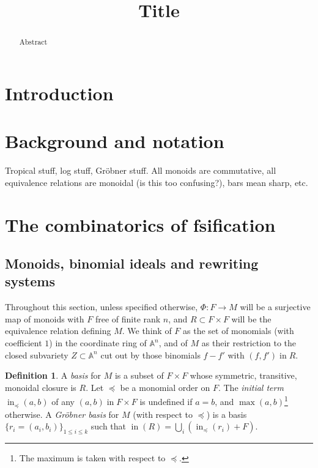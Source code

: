 \documentclass[a4paper,12pt]{amsart} %
\title[label]{Title}
\numberwithin{equation}{subsection}
\renewcommand{\in}{\operatorname{in}}
\newcommand{\inleq}{\operatorname{in}_{\preceq}}
\newcommand{\bb}[1]{{\mathbb{#1}}}
\theoremstyle{definition}
\newtheorem{definition}{Definition}[section]
\theoremstyle{plain}%
\theoremstyle{remark}
\begin{document}
\begin{abstract} 
Abstract
\end{abstract}

\maketitle
	


\tableofcontents



\section{Introduction}

\section{Background and notation}
Tropical stuff, log stuff, Gr\"obner stuff. All monoids are commutative, all equivalence relations are monoidal (is this too confusing?), bars mean sharp, etc.

\section{The combinatorics of fsification}
\subsection{Monoids, binomial ideals and rewriting systems}

Throughout this section, unless specified otherwise, $\Phi\colon F \to M$ will be a surjective map of monoids with $F$ free of finite rank $n$, and $R\subset F\times F$ will be the equivalence relation defining $M$. We think of $F$ as the set of monomials (with coefficient $1$) in the coordinate ring of $\bb A^n$, and of $M$ as their restriction to the closed subvariety $Z\subset \bb A^n$ cut out by those binomials $f-f'$ with $(f,f')\in R$.

\begin{definition}
	A \emph{basis} for $M$ is a subset of $F\times F$ whose symmetric, transitive, monoidal closure is $R$. Let $\preceq$ be a monomial order on $F$. The \emph{initial term} $\inleq(a,b)$ of any $(a,b)\in F\times F$ is undefined if $a=b$, and $\max(a,b)$\footnote{The maximum is taken with respect to $\preceq$.} otherwise. A \emph{Gr\"obner basis} for $M$ (with respect to $\preceq$) is a basis $\{r_i=(a_i,b_i)\}_{1\leq i\leq k}$ such that $\in(R)=\bigcup\limits_i(\inleq(r_i)+F)$.
\end{definition}
\end{document}
